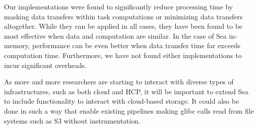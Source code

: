 Our implementations were found to significantly reduce processing time by
masking data transfers within task computations or minimizing data transfers
altogether. While they can be applied in all cases, they have been found to be
most effective when data and computation are similar. In the case of Sea
in-memory, performance can be even better when data transfer time far exceeds
computation time. Furthermore, we have not found either implementations to incur
significant overheads.

As more and more researchers are starting to interact with diverse types of
infrastructures, such as both cloud and HCP, it will be important to extend Sea
to include functionality to interact with cloud-based storage. It could also be
done in such a way that enable existing pipelines making glibc calls read from
file systems such as S3 without instrumentation.



